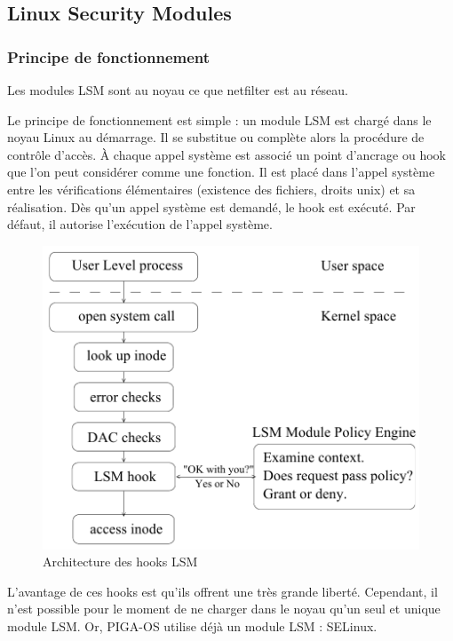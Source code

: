 \documentclass[pdftex,a4paper,titlepage,11pt]{article}
\begin{document}
\subsection{Linux Security Modules}

\subsubsection{Principe de fonctionnement}

Les modules LSM sont au noyau ce que netfilter est au réseau.

Le principe de fonctionnement est simple : un module LSM est chargé dans le noyau Linux au démarrage. Il se substitue ou complète alors la procédure de contrôle d'accès. \`A chaque appel système est associé un point d'ancrage ou hook que l'on peut considérer comme une fonction. Il est placé dans l'appel système entre les vérifications élémentaires (existence des fichiers, droits unix) et sa réalisation. Dès qu'un appel système est demandé, le hook est exécuté. Par défaut, il autorise l'exécution de l'appel système.

\begin{figure}[hb]
	\centering
	\includegraphics[scale=0.45]{attachements/lsm1.png}
	\caption{Architecture des hooks LSM \cite{LSMINTRO}}
\end{figure}

L'avantage de ces hooks est qu'ils offrent une très grande liberté. Cependant, il n'est possible pour le moment de ne charger dans le noyau qu'un seul et unique module LSM. Or, PIGA-OS utilise déjà un module LSM : SELinux.
\end{document}
